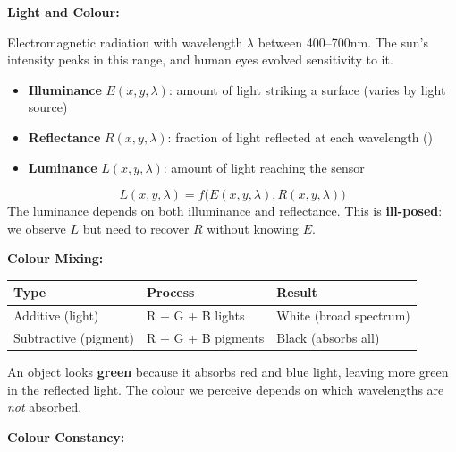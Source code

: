 \separator

\textbf{Light and Colour:}

\begin{defbox}
Electromagnetic radiation with wavelength $\lambda$ between 400--700nm. The sun's intensity peaks in this range, and human eyes evolved sensitivity to it.
\end{defbox}

\begin{itemize}
  \item \textbf{Illuminance} $E(x,y,\lambda)$: amount of light striking a surface (varies by light source)
  \item \textbf{Reflectance} $R(x,y,\lambda)$: fraction of light reflected at each wavelength ()
  \item \textbf{Luminance} $L(x,y,\lambda)$: amount of light reaching the sensor
\end{itemize}

\begin{thmbox}
\[
L(x,y,\lambda) = f\bigl(E(x,y,\lambda), R(x,y,\lambda)\bigr)
\]
The luminance depends on both illuminance and reflectance. This is \textbf{ill-posed}: we observe $L$ but need to recover $R$ without knowing $E$.
\end{thmbox}

\separator

\textbf{Colour Mixing:}

\begin{center}
\renewcommand{\arraystretch}{1.3}
\begin{tabular}{@{} l l l @{}}
\toprule
\textbf{Type} & \textbf{Process} & \textbf{Result} \\
\midrule
Additive (light) & R + G + B lights & White (broad spectrum) \\
Subtractive (pigment) & R + G + B pigments & Black (absorbs all) \\
\bottomrule
\end{tabular}
\end{center}

\begin{exbox}
An object looks \textbf{green} because it absorbs red and blue light, leaving more green in the reflected light. The colour we perceive depends on which wavelengths are \textit{not} absorbed.
\end{exbox}

\separator

\textbf{Colour Constancy:}

